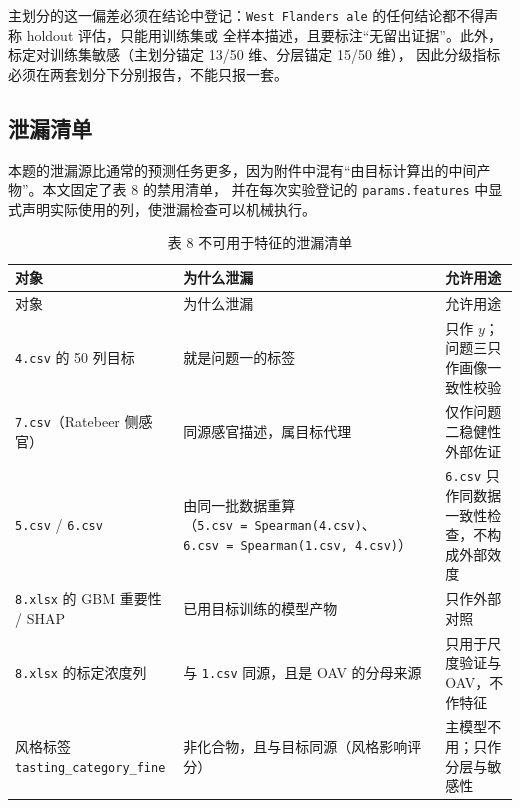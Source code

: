 \documentclass[
  a4paper,12pt]{article}
\begin{document}
主划分的这一偏差必须在结论中登记：\texttt{West\ Flanders\ ale}
的任何结论都不得声称 holdout 评估，只能用训练集或
全样本描述，且要标注``无留出证据''。此外，标定对训练集敏感（主划分锚定
13/50 维、分层锚定 15/50 维），
因此分级指标必须在两套划分下分别报告，不能只报一套。

\subsection{泄漏清单}\label{ux6cc4ux6f0fux6e05ux5355}

本题的泄漏源比通常的预测任务更多，因为附件中混有``由目标计算出的中间产物''。本文固定了表
8 的禁用清单， 并在每次实验登记的 \texttt{params.features}
中显式声明实际使用的列，使泄漏检查可以机械执行。

\begin{longtable}[]{@{}
  >{\raggedright\arraybackslash}p{}
  >{\raggedright\arraybackslash}p{}
  >{\raggedright\arraybackslash}p{}@{}}
\caption{表 8 不可用于特征的泄漏清单}\tabularnewline
\toprule\noalign{}
\begin{minipage}[b]{\linewidth}\raggedright
对象
\end{minipage} & \begin{minipage}[b]{\linewidth}\raggedright
为什么泄漏
\end{minipage} & \begin{minipage}[b]{\linewidth}\raggedright
允许用途
\end{minipage} \\
\midrule\noalign{}
\endfirsthead
\toprule\noalign{}
\begin{minipage}[b]{\linewidth}\raggedright
对象
\end{minipage} & \begin{minipage}[b]{\linewidth}\raggedright
为什么泄漏
\end{minipage} & \begin{minipage}[b]{\linewidth}\raggedright
允许用途
\end{minipage} \\
\midrule\noalign{}
\endhead
\bottomrule\noalign{}
\endlastfoot
\texttt{4.csv} 的 50 列目标 & 就是问题一的标签 & 只作
\(y\)；问题三只作画像一致性校验 \\
\texttt{7.csv}（Ratebeer 侧感官） & 同源感官描述，属目标代理 &
仅作问题二稳健性外部佐证 \\
\texttt{5.csv} / \texttt{6.csv} &
由同一批数据重算（\texttt{5.csv\ =\ Spearman(4.csv)}、\texttt{6.csv\ =\ Spearman(1.csv,\ 4.csv)}）
& \texttt{6.csv} 只作同数据一致性检查，不构成外部效度 \\
\texttt{8.xlsx} 的 GBM 重要性 / SHAP & 已用目标训练的模型产物 &
只作外部对照 \\
\texttt{8.xlsx} 的标定浓度列 & 与 \texttt{1.csv} 同源，且是 OAV
的分母来源 & 只用于尺度验证与 OAV，不作特征 \\
风格标签 \texttt{tasting\_category\_fine} &
非化合物，且与目标同源（风格影响评分） & 主模型不用；只作分层与敏感性 \\
\end{longtable}
\end{document}
